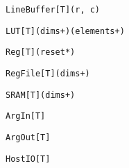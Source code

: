\begin{table*}
\newsavebox{\lineBufferSyntax}
\begin{lrbox}{\lineBufferSyntax}
\begin{lstlisting}[language=SpatialTable]
LineBuffer[T](r, c)
\end{lstlisting}
\end{lrbox}

\newsavebox{\lutSyntax}
\begin{lrbox}{\lutSyntax}
\begin{lstlisting}[language=SpatialTable]
LUT[T](dims+)(elements+)
\end{lstlisting}
\end{lrbox}

\newsavebox{\regSyntax}
\begin{lrbox}{\regSyntax}
\begin{lstlisting}[language=SpatialTable]
Reg[T](reset*)
\end{lstlisting}
\end{lrbox}

\newsavebox{\regfileSyntax}
\begin{lrbox}{\regfileSyntax}
\begin{lstlisting}[language=SpatialTable]
RegFile[T](dims+)
\end{lstlisting}
\end{lrbox}

\newsavebox{\sramSyntax}
\begin{lrbox}{\sramSyntax}
\begin{lstlisting}[language=SpatialTable]
SRAM[T](dims+)
\end{lstlisting}
\end{lrbox}

\newsavebox{\argInSyntax}
\begin{lrbox}{\argInSyntax}
\begin{lstlisting}[language=SpatialTable]
ArgIn[T]
\end{lstlisting}
\end{lrbox}

\newsavebox{\argOutSyntax}
\begin{lrbox}{\argOutSyntax}
\begin{lstlisting}[language=SpatialTable]
ArgOut[T]
\end{lstlisting}
\end{lrbox}

\newsavebox{\hostIOSyntax}
\begin{lrbox}{\hostIOSyntax}
\begin{lstlisting}[language=SpatialTable]
HostIO[T]
\end{lstlisting}
\end{lrbox}


\end{table*}
